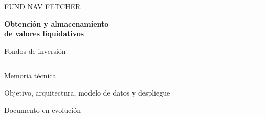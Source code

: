 \documentclass[11pt,a4paper,oneside,openany]{book}
\begin{document}
\frontmatter
\hypersetup{pageanchor=false}
\begin{titlepage}
  \sffamily
  {\small\color{ProjectMuted} FUND NAV FETCHER\par}
  \vspace{2.8cm}
  {\Huge\bfseries\color{ProjectBlue}
    Obtención y almacenamiento\\[0.25em]
    de valores liquidativos\par}
  \vspace{0.8cm}
  {\Large Fondos de inversión\par}
  \vspace{1.2cm}
  {\color{ProjectBlue}\rule{\textwidth}{1.2pt}\par}
  \vspace{0.6cm}
  {\large Memoria técnica\par}
  {\color{ProjectMuted} Objetivo, arquitectura, modelo de datos y despliegue\par}
  \vfill
  {\small\color{ProjectMuted} Documento en evolución\par}
\end{titlepage}
\hypersetup{pageanchor=true}
\tableofcontents

\mainmatter






\end{document}
